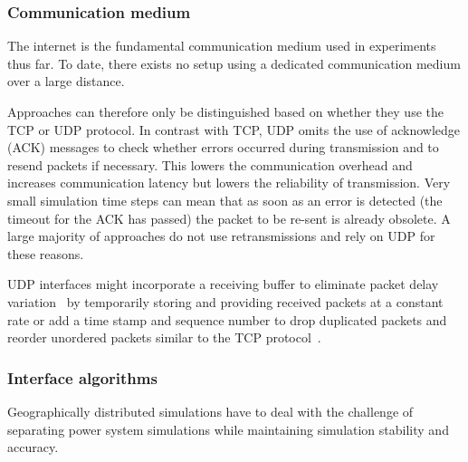 \documentclass[a4paper]{atseminar}
\begin{document}

\subsubsection{Communication medium}
\label{MH:sec:comm}

The internet is the fundamental communication medium used in experiments thus far. To date, there exists no setup using a dedicated communication medium over a large distance.

Approaches can therefore only be distinguished based on whether they use the TCP or UDP protocol.
In contrast with TCP, UDP omits the use of acknowledge (ACK) messages to check whether errors occurred during transmission and to resend packets if necessary. This lowers the communication overhead and increases communication latency but lowers the reliability of transmission. Very small simulation time steps can mean that as soon as an error is detected (the timeout for the ACK has passed) the packet to be re-sent is already obsolete. A large majority of approaches do not use retransmissions and rely on UDP for these reasons.

UDP interfaces might incorporate a receiving buffer to eliminate packet delay variation~\cite{rfc3393} by temporarily storing and providing received packets at a constant rate or add a time stamp and sequence number to drop duplicated packets and reorder unordered packets similar to the TCP protocol~\cite{stevic2017europe}. 

\subsubsection{Interface algorithms}
\label{MH:sec:ia}

Geographically distributed simulations have to deal with the challenge of separating power system simulations while maintaining simulation stability and accuracy.
\end{document}
